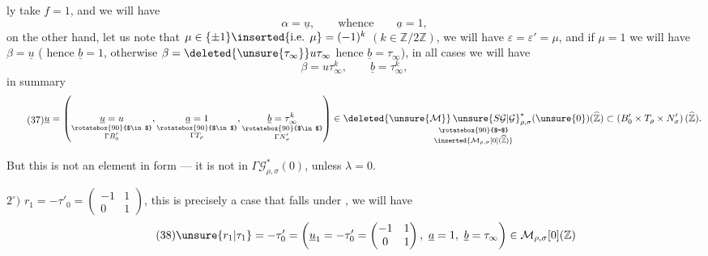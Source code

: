ly take $f=1$, and we will have
\[
\alpha=\underline u,\qquad\text{whence}\qquad\underline a=1,
\]
on the other hand, let us note that $\mu\in\{\pm1\}\inserted{\text{i.e. }\mu}=(-1)^k$ $(k\in\mathbb Z/2\mathbb Z)$, we will have $\varepsilon=\varepsilon'=\mu$, and if $\mu=1$  we will have $\beta=\underline u$ ( hence $\underline b=1$, otherwise $\beta=\deleted{\unsure{\tau_\infty}}u\tau_\infty$ hence $\underline b=\tau_\infty$), in all cases we will have
\[
\beta=u\tau_\infty^k,\qquad\underline b=\tau_\infty^k,
\]
in summary
\[
\tag{37}
\begin{gathered}
\underline u=\left(
\underset{\substack{\rotatebox{90}{$\in$}\\\Gamma B'_0}}{\underline u=u},
\underset{\substack{\rotatebox{90}{$\in$}\\\Gamma T_\rho}}{\underline a=1},
\underset{\substack{\rotatebox{90}{$\in$}\\\Gamma N'_\sigma}}{\underline b=\tau_\infty^k}
\right)
\in
\underset{\substack{\rotatebox{90}{$=$}\\\inserted{\mathcal M_{\rho,\sigma}[0](\widehat{\mathbb Z})}}}
{\deleted{\unsure{\mathcal M}}\,\unsure{S\mathcal G|\mathcal G}_{\rho,\sigma}^{*}(\unsure{0})(\widehat{\mathbb Z})}
\subset\left(B'_0\times T_\rho\times N'_\sigma\right)(\widehat{\mathbb Z}).
\end{gathered}
\]


But this is not an element in   form ---   it is not in $\Gamma\mathcal G_{\rho,\sigma}^{*}(0)$, unless $\lambda=0$. 

$2^\circ)$ $r_1=-\tau'_0=\begin{pmatrix}-1&1\\0&1\end{pmatrix}$, this is precisely a case that falls under , we will have
\[
\tag{38}
\unsure{r_1|\tau_1}=-\tau'_0=
\left(\underline u_1=-\tau'_0=\begin{pmatrix}-1&1\\0&1\end{pmatrix},\ \underline a=1,\ \underline b=\tau_\infty\right)
\in\mathcal M_{\rho,\sigma}[0](\mathbb Z)
\]

